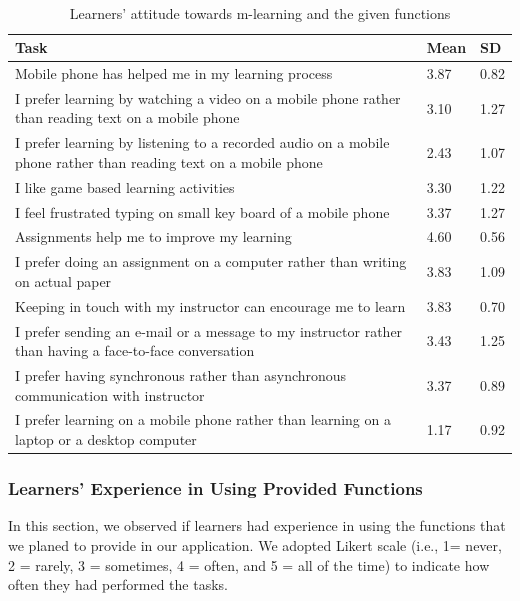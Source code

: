 \documentclass[a4paper,twoside]{article}
\begin{document}
\begin{table}
\centering
\caption{Learners' attitude towards m-learning and the given functions}\
\begin{tabular}[BP]{ | p{12.0cm} | p{1cm} | p{1cm} |}
\hline Task & Mean & SD\\ 
\hline Mobile phone has helped me in my learning process & 3.87 & 0.82\\
\hline I prefer learning by watching a video on a mobile phone rather than reading text on a mobile phone& 3.10 & 1.27 \\
\hline I prefer learning by listening to a recorded audio on a mobile phone rather than reading text on a mobile phone & 2.43 &1.07\\
\hline I like game based learning activities & 3.30 & 1.22\\
\hline I feel frustrated typing on small key board of a mobile phone & 3.37 &1.27\\
\hline Assignments help me to improve my learning & 4.60 & 0.56 \\
\hline I prefer doing an assignment on a computer rather than writing on actual paper & 3.83 & 1.09\\
\hline Keeping in touch with my instructor can encourage me to learn & 3.83 & 0.70\\
\hline I prefer sending an e-mail or a message to my instructor rather than having a face-to-face conversation&3.43 &1.25\\
\hline I prefer having synchronous rather than asynchronous communication with instructor & 3.37 & 0.89\\
\hline I prefer learning on a mobile phone rather than learning on a laptop or a desktop computer & 1.17 &0.92\\
\hline
\end{tabular}
\end{table}
\subsubsection{Learners' Experience in Using Provided Functions}
In this section, we observed if learners had experience in using the functions that we planed to provide in our application. We adopted Likert scale (i.e., 1= never, 2 = rarely, 3 = sometimes, 4 = often, and 5 = all of the time) to indicate how often they had performed the tasks. 
\end{document}
